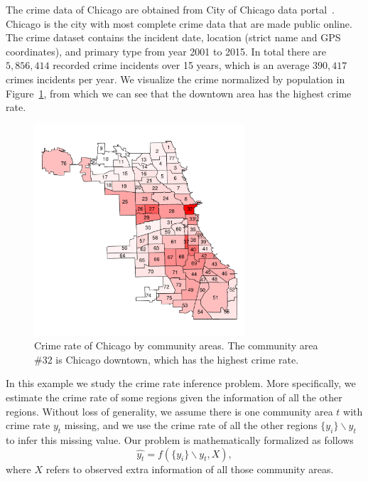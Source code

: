 The crime data of Chicago are obtained from City of Chicago data portal~\cite{crime-data}. Chicago is the city with most complete crime data that are made public online. The crime dataset contains the incident date, location (strict name and GPS coordinates), and primary type from year 2001 to 2015. In total there are $5,856,414$ recorded crime incidents over 15 years, which is an average $390,417$ crimes incidents per year. We visualize the crime normalized by population in Figure~\ref{fig:crime-ca}, from which we can see that the downtown area has the highest crime rate.

\begin{figure}[t]
\centering
\includegraphics[width=0.7\textwidth]{fig/crime-ca.pdf}
\caption{Crime rate of Chicago by community areas. The community area \#32 is Chicago downtown, which has the highest crime rate.}
\label{fig:crime-ca}
\end{figure}


In this example we study the crime rate inference problem. More specifically, we estimate the crime rate of some regions given the information of all the other regions. Without loss of generality, we assume there is one community area $t$ with crime rate $y_t$ missing, and we use the crime rate of all the other regions $\{y_i \} \backslash y_t$ to infer this missing value. Our problem is mathematically formalized as follows
\begin{equation}
\hat{y_t} = f( \{y_i\} \backslash y_t, X),
\end{equation}
where  $X$ refers to observed extra information of  all those community areas.


